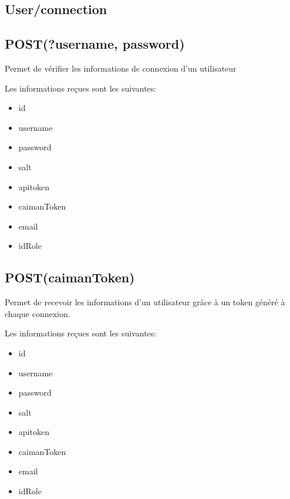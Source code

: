 \documentclass[a4paper,12pt,french]{sphinxmanual}
\begin{document}
\subsection{User/connection}
\label{\detokenize{fonctionnelle:user-connection}}

\subsection{POST(?username, password)}
\label{\detokenize{fonctionnelle:post-username-password}}
\sphinxAtStartPar
Permet de vérifier les informations de connexion d’un utilisateur

\sphinxAtStartPar
Les informations reçues sont les suivantes:
\begin{itemize}
\item {} 
\sphinxAtStartPar
id

\item {} 
\sphinxAtStartPar
username

\item {} 
\sphinxAtStartPar
password

\item {} 
\sphinxAtStartPar
salt

\item {} 
\sphinxAtStartPar
apitoken

\item {} 
\sphinxAtStartPar
caimanToken

\item {} 
\sphinxAtStartPar
email

\item {} 
\sphinxAtStartPar
idRole

\end{itemize}


\subsection{POST(caimanToken)}
\label{\detokenize{fonctionnelle:post-caimantoken}}
\sphinxAtStartPar
Permet de recevoir les informations d’un utilisateur grâce à un token généré à chaque connexion.

\sphinxAtStartPar
Les informations reçues sont les suivantes:
\begin{itemize}
\item {} 
\sphinxAtStartPar
id

\item {} 
\sphinxAtStartPar
username

\item {} 
\sphinxAtStartPar
password

\item {} 
\sphinxAtStartPar
salt

\item {} 
\sphinxAtStartPar
apitoken

\item {} 
\sphinxAtStartPar
caimanToken

\item {} 
\sphinxAtStartPar
email

\item {} 
\sphinxAtStartPar
idRole

\end{itemize}
\end{document}

